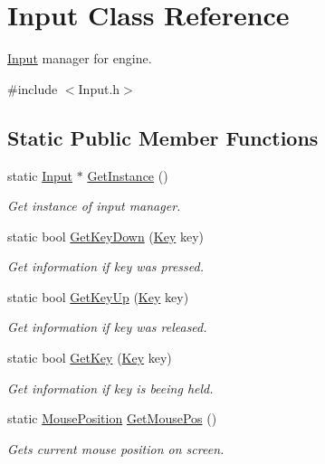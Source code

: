 \hypertarget{class_input}{}\section{Input Class Reference}
\label{class_input}


\mbox{\hyperlink{class_input}{Input}} manager for engine.  




{\ttfamily \#include $<$Input.\+h$>$}

\subsection*{Static Public Member Functions}
\begin{DoxyCompactItemize}
\item 
static \mbox{\hyperlink{class_input}{Input}} $\ast$ \mbox{\hyperlink{class_input_aff0a59bfb791181b0741d2d6d5538ff6}{Get\+Instance}} ()
\begin{DoxyCompactList}\small\item\em Get instance of input manager. \end{DoxyCompactList}\item 
static bool \mbox{\hyperlink{class_input_a5b29d282d8c937962865527fc886c862}{Get\+Key\+Down}} (\mbox{\hyperlink{_input_8h_ab3c7af4820830f9166ede9e5623c4e73}{Key}} key)
\begin{DoxyCompactList}\small\item\em Get information if key was pressed. \end{DoxyCompactList}\item 
static bool \mbox{\hyperlink{class_input_a03ee6f16ccae40e4acf900f41e798c4a}{Get\+Key\+Up}} (\mbox{\hyperlink{_input_8h_ab3c7af4820830f9166ede9e5623c4e73}{Key}} key)
\begin{DoxyCompactList}\small\item\em Get information if key was released. \end{DoxyCompactList}\item 
static bool \mbox{\hyperlink{class_input_a3e693a63675d0aa58cc0fe922dc0a8b2}{Get\+Key}} (\mbox{\hyperlink{_input_8h_ab3c7af4820830f9166ede9e5623c4e73}{Key}} key)
\begin{DoxyCompactList}\small\item\em Get information if key is beeing held. \end{DoxyCompactList}\item 
static \mbox{\hyperlink{struct_mouse_position}{Mouse\+Position}} \mbox{\hyperlink{class_input_a946fb755b072d22267097e7118c752c0}{Get\+Mouse\+Pos}} ()
\begin{DoxyCompactList}\small\item\em Gets current mouse position on screen. \end{DoxyCompactList}\end{DoxyCompactItemize}
